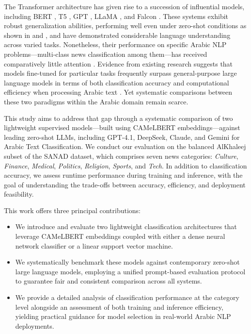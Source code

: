 \documentclass[preprint,12pt,authoryear]{elsarticle}
\begin{document}
The Transformer architecture \cite{vaswani2017attention} has given rise to a succession of influential models, including BERT \cite{devlin2018bert}, T5 \cite{roberts2019exploring}, GPT \cite{DBLP:journals/corr/abs-2005-14165}, LLaMA \cite{touvron2023llama}, and Falcon \cite{almazrouei2023falcon}. These systems exhibit robust generalization abilities, performing well even under zero-shot conditions as shown in \cite{DBLP:journals/corr/abs-1909-00161} and \cite{gera2022zero}, and have demonstrated considerable language understanding across varied tasks. Nonetheless, their performance on specific Arabic NLP problems—multi-class news classification among them—has received comparatively little attention \cite{wahdan2024systematic}. Evidence from existing research suggests that models fine-tuned for particular tasks frequently surpass general-purpose large language models in terms of both classification accuracy and computational efficiency when processing Arabic text \cite{alruily2023automated, nassif2022arabic}. Yet systematic comparisons between these two paradigms within the Arabic domain remain scarce.

This study aims to address that gap through a systematic comparison of two lightweight supervised models—built using CAMeLBERT embeddings—against leading zero-shot LLMs, including GPT-4.1, DeepSeek, Claude, and Gemini for Arabic Text Classification. We conduct our evaluation on the balanced AlKhaleej subset of the SANAD dataset, which comprises seven news categories: \textit{Culture}, \textit{Finance}, \textit{Medical}, \textit{Politics}, \textit{Religion}, \textit{Sports}, and \textit{Tech}. In addition to classification accuracy, we assess runtime performance during training and inference, with the goal of understanding the trade-offs between accuracy, efficiency, and deployment feasibility.

This work offers three principal contributions:
\begin{itemize}
    \item We introduce and evaluate two lightweight classification architectures that leverage CAMeLBERT embeddings coupled with either a dense neural network classifier or a linear support vector machine.
    \item We systematically benchmark these models against contemporary zero-shot large language models, employing a unified prompt-based evaluation protocol to guarantee fair and consistent comparison across all systems.
    \item We provide a detailed analysis of classification performance at the category level alongside an assessment of both training and inference efficiency, yielding practical guidance for model selection in real-world Arabic NLP deployments.
\end{itemize}
\end{document}
